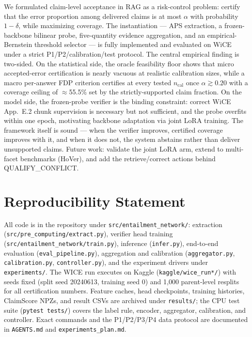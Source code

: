 \documentclass{article}
\begin{document}
We formulated claim-level acceptance in RAG as a risk-control problem:
certify that the error proportion among delivered claims is at most
$\alpha$ with probability $1-\delta$, while maximizing coverage. The
instantiation --- APS extraction, a frozen-backbone bilinear probe,
five-quantity evidence aggregation, and an empirical-Bernstein
threshold selector --- is fully implemented and evaluated on WiCE under
a strict P1/P2/calibration/test protocol. The central empirical finding
is two-sided. On the statistical side, the oracle feasibility floor
shows that micro accepted-error certification is nearly vacuous at
realistic calibration sizes, while a macro per-answer FDP criterion
certifies at every tested $n_{\mathrm{cal}}$ once $\alpha\gtrsim0.20$
with a coverage ceiling of $\approx$55.5\% set by the strictly-supported
claim fraction. On the model side, the frozen-probe verifier is the
binding constraint: correct WiCE App.~E.2 chunk supervision is
necessary but not sufficient, and the probe overfits within one epoch,
motivating backbone adaptation via joint LoRA training. The framework
itself is sound --- when the verifier improves, certified coverage
improves with it, and when it does not, the system abstains rather than
deliver unsupported claims. Future work: validate the joint LoRA arm,
extend to multi-facet benchmarks (HoVer), and add the retrieve/correct
actions behind QUALIFY\_CONFLICT.

\section*{Reproducibility Statement}
\label{sec:repro}
All code is in the repository under
\texttt{src/entailment\_network/}: extraction (\texttt{src/pre\_computing/extract.py}),
verifier head training (\texttt{src/entailment\_network/train.py}),
inference (\texttt{infer.py}), end-to-end evaluation
(\texttt{eval\_pipeline.py}), aggregation and calibration
(\texttt{aggregator.py}, \texttt{calibration.py},
\texttt{controller.py}), and the experiment drivers under
\texttt{experiments/}. The WICE run executes on Kaggle
(\texttt{kaggle/wice\_run*/}) with seeds fixed (split seed 20240613,
training seed 0) and 1{,}000 parent-level resplits for all
certification numbers. Feature caches, head checkpoints, training
histories, ClaimScore NPZs, and result CSVs are archived under
\texttt{results/}; the CPU test suite (\texttt{pytest tests/}) covers
the label rule, encoder, aggregator, calibration, and controller. Exact
commands and the P1/P2/P3/P4 data protocol are documented in
\texttt{AGENTS.md} and \texttt{experiments\_plan.md}.
\end{document}
